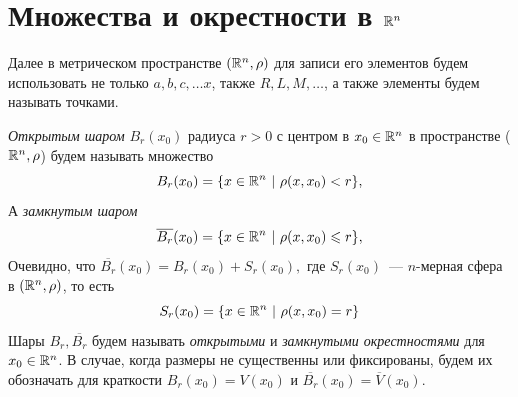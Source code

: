 \documentclass[../../main.tex]{subfiles}
\begin{document}
  
  \section{Множества и окрестности в $\mathbb{R}^n$}
  Далее в метрическом пространстве $(\mathbb{R}^n, \rho)$ для записи его 
  элементов будем использовать не только $a, b, c, \dots x$, также 
  $R, L, M, \dots$, а также элементы будем называть точками.
  
  \emph{Открытым шаром} $B_r(x_0)$ радиуса $r > 0$ с центром в $x_0 \in 
  \mathbb{R}^n$ в пространстве ($\mathbb{R}^n, \rho$) будем называть множество 
  \[
  B_r(x_0) = \{x \in \mathbb{R}^n\ |\ \rho(x, x_0) < r\}, 
  \]
  А \emph{замкнутым шаром}
  \[
  \overline{B_r}(x_0) = \{x \in \mathbb{R}^n\ |\ \rho(x, x_0) \leqslant r\}, 
  \] 
  Очевидно, что $\overline{B_r}(x_0) = B_r(x_0) + S_r(x_0),$ где $ 
  S_r(x_0)$~--- $n$-мерная сфера в  $(\mathbb{R}^n, \rho)$, то есть 
  \[
  S_r(x_0) = \{x \in \mathbb{R}^n\ |\ \rho(x, x_0) = r\}
  \] 
  Шары $B_r, \overline{B_r}$ будем называть \emph{открытыми} и 
  \emph{замкнутыми 
  окрестностями} для $x_0 \in \mathbb{R}^n$. В случае, когда размеры не 
  существенны или фиксированы, будем их обозначать для краткости 
  $B_r(x_0) = V(x_0)$ и $\overline{B_r}(x_0) = \overline{V}(x_0)$.
  
\end{document}
